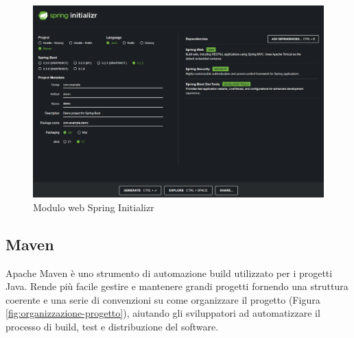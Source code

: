 \begin{figure}[h]
    \centering
    \includegraphics[width=1.0\textwidth]{images/spring initializr.png}
    \caption{Modulo web Spring Initializr}
    \label{fig:spring-initializr}
\end{figure}
\newpage

\subsection{Maven}
Apache Maven è uno strumento di automazione build utilizzato per i progetti Java.
Rende più facile gestire e mantenere grandi progetti fornendo una struttura coerente e una serie di convenzioni su come organizzare il progetto (Figura \ref{fig:organizzazione-progetto}), aiutando gli sviluppatori ad automatizzare il processo di build, test e distribuzione del software.

